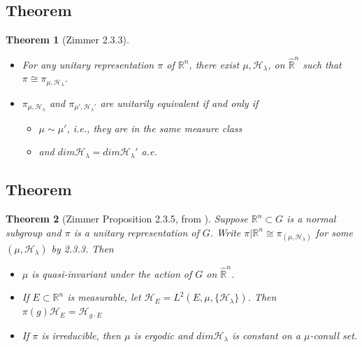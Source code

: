\documentclass[
]{article}
\theoremstyle{break}
\newtheorem{thm}{Theorem}
\theoremstyle{plain}
\begin{document}
\hypertarget{theorem}{%
\subsection{Theorem}\label{theorem}}

\begin{thm}[Zimmer 2.3.3]
  \begin{itemize}
    \item For any unitary representation $\pi$ of
      $\mathbb{R}^n$, there exist $\mu, \mathscr{H}_{\lambda}$, on
      $\hat{\mathbb{R}}^n$ such that $\pi \cong \pi_{\mu, \mathscr{H}_{\lambda}}$.
    \item $\pi_{\mu, \mathscr{H}_{\lambda}}$ and
      $\pi_{\mu', \mathscr{H}_{\lambda}'}$ are unitarily equivalent if and only if 
      \begin{itemize}
        \item $\mu \sim \mu'$, i.e., they are in the same measure class
        \item and $dim\mathscr{H}_{\lambda} = dim \mathscr{H}_{\lambda}'$ a.e.
      \end{itemize}
  \end{itemize}
\end{thm}

\hypertarget{theorem-1}{%
\subsection{Theorem}\label{theorem-1}}

\begin{thm}[Zimmer Proposition 2.3.5, from  \cite{mackey76}]
   
Suppose $\mathbb{R}^n \subset G$ is a normal subgroup and $\pi$ is a unitary representation of $G$.
Write $\pi | \mathbb{R}^n \cong \pi_{(\mu, \mathscr{H}_{\lambda})}$ for some
$(\mu, \mathscr{H}_{\lambda})$ by 2.3.3. Then  
  \begin{itemize}
    \item $\mu$ is quasi-invariant under the action of $G$ on $\hat{\mathbb{R}}^n$. 
    \item If $E \subset \mathbb{R}^n$ is measurable, let
      $\mathscr{H}_E = L^2(E, \mu, \{\mathscr{H}_{\lambda}\})$.
      Then $\pi(g)\mathscr{H}_E = \mathscr{H}_{g \cdot E}$
    \item If $\pi$ is irreducible, then $\mu$ is ergodic and $dim\mathscr{H}_{\lambda}$ is
      constant on a $\mu$-conull set.
  \end{itemize}
\end{thm}
\end{document}
